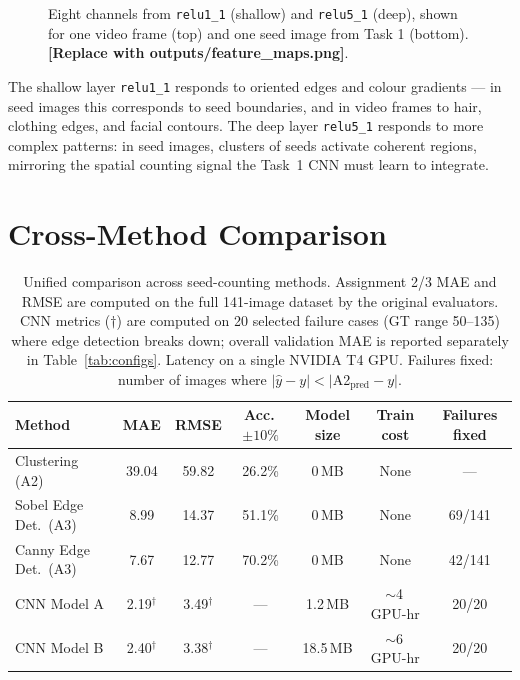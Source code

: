\documentclass[11pt,a4paper]{article}
\begin{document}
\begin{figure}[h]
\centering
\fbox{\rule{0pt}{5cm}\rule{\linewidth}{0pt}}
\caption{Eight channels from \texttt{relu1\_1} (shallow) and \texttt{relu5\_1} (deep),
shown for one video frame (top) and one seed image from Task 1 (bottom).
\textbf{[Replace with outputs/feature\_maps.png]}.}
\label{fig:feature_maps}
\end{figure}

The shallow layer \texttt{relu1\_1} responds to oriented edges and colour gradients ---
in seed images this corresponds to seed boundaries, and in video frames to hair, clothing
edges, and facial contours. The deep layer \texttt{relu5\_1} responds to more complex
patterns: in seed images, clusters of seeds activate coherent regions, mirroring the
spatial counting signal the Task~1 CNN must learn to integrate.

\section{Cross-Method Comparison}

\begin{table}[h]
\centering
\caption{Unified comparison across seed-counting methods. Assignment 2/3 MAE and RMSE
are computed on the full 141-image dataset by the original evaluators. CNN metrics
($\dagger$) are computed on 20 selected failure cases (GT range 50--135) where
edge detection breaks down; overall validation MAE is reported separately in
Table~\ref{tab:configs}. Latency on a single NVIDIA T4 GPU.
Failures fixed: number of images where $|\hat{y}-y| < |$A2$_{\text{pred}}-y|$.}
\begin{tabular}{lcccccc}
\toprule
Method & MAE & RMSE & Acc.\,$\pm10\%$ & Model size & Train cost & Failures fixed \\
\midrule
Clustering (A2)      & 39.04 & 59.82 & 26.2\% & 0\,MB   & None           & --- \\
Sobel Edge Det.\ (A3) & 8.99  & 14.37 & 51.1\% & 0\,MB   & None           & 69/141 \\
Canny Edge Det.\ (A3) & 7.67  & 12.77 & 70.2\% & 0\,MB   & None           & 42/141 \\
CNN Model A          & 2.19$^\dagger$ & 3.49$^\dagger$ & --- & 1.2\,MB & $\sim$4\,GPU-hr & 20/20 \\
CNN Model B          & 2.40$^\dagger$ & 3.38$^\dagger$ & --- & 18.5\,MB & $\sim$6\,GPU-hr & 20/20 \\
\bottomrule
\end{tabular}
\label{tab:comparison}
\end{table}
\end{document}
